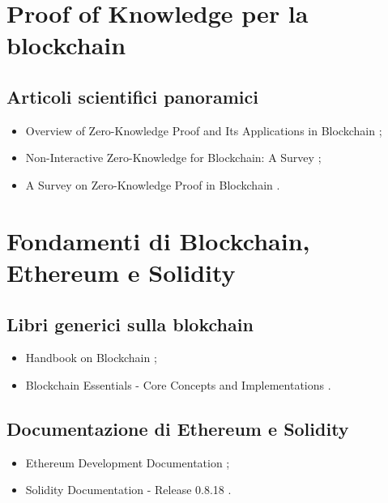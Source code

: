 \section*{Proof of Knowledge per la blockchain}

\subsection*{Articoli scientifici panoramici}
\begin{itemize}

\item Overview of Zero-Knowledge Proof and Its Applications in Blockchain \cite{zhou2022zerochain};

\item Non-Interactive Zero-Knowledge for Blockchain: A Survey \cite{partala2020zerochain};

\item A Survey on Zero-Knowledge Proof in Blockchain \cite{sun2021zerochain}.

\end{itemize}

\section*{Fondamenti di Blockchain, Ethereum e Solidity}

\subsection*{Libri generici sulla blokchain}
\begin{itemize}

\item Handbook on Blockchain \cite{tran2022blockchain};

\item Blockchain Essentials - Core Concepts and Implementations \cite{mangrulkar2024blockchain}.

\end{itemize}

\subsection*{Documentazione di Ethereum e Solidity}
\begin{itemize}

\item Ethereum Development Documentation \cite{ethereum2024doc};

\item Solidity Documentation - Release 0.8.18 \cite{solidity0.8.18doc}.

\end{itemize}

